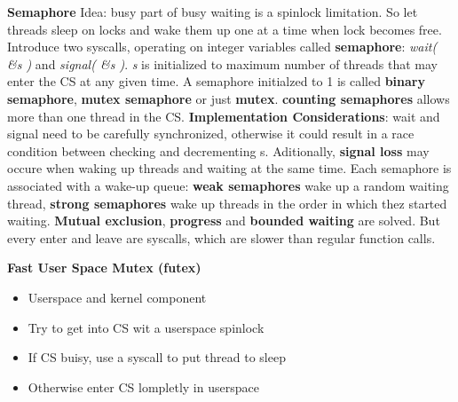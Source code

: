 \documentclass[11pt,a4paper]{article}
\begin{document}
	\textbf{Semaphore} \newline
	Idea: busy part of busy waiting is a spinlock limitation. So let threads sleep on locks and wake them up one at a time when lock becomes free. \newline
	Introduce two syscalls, operating on integer variables called \textbf{semaphore}: \textit{wait( \&s )} and \textit{signal( \&s )}. \textit{s} is initialized to maximum number of threads that may enter the CS at any given time. A semaphore initialzed to 1 is called \textbf{binary semaphore}, \textbf{mutex semaphore} or just \textbf{mutex}. \textbf{counting semaphores} allows more than one thread in the CS. \newline
	\textbf{Implementation Considerations}: wait and signal need to be carefully synchronized, otherwise it could result in a race condition between checking and decrementing s. Aditionally, \textbf{signal loss} may occure when waking up threads and waiting at the same time. Each semaphore is associated with a wake-up queue: \textbf{weak semaphores} wake up a random waiting thread, \textbf{strong semaphores} wake up threads in the order in which thez started waiting. \newline
	\textbf{Mutual exclusion}, \textbf{progress} and \textbf{bounded waiting} are solved. But every enter and leave are syscalls, which are slower than regular function calls. \newline
	
	\textbf{Fast User Space Mutex (futex)} \newline
	\begin{itemize}
		\item Userspace and kernel component
		\item Try to get into CS wit a userspace spinlock
		\item If CS buisy, use a syscall to put thread to sleep
		\item Otherwise enter CS lompletly in userspace
	\end{itemize}
		
	
	\newpage
	
	\printglossaries
	
	
	
\end{document}
